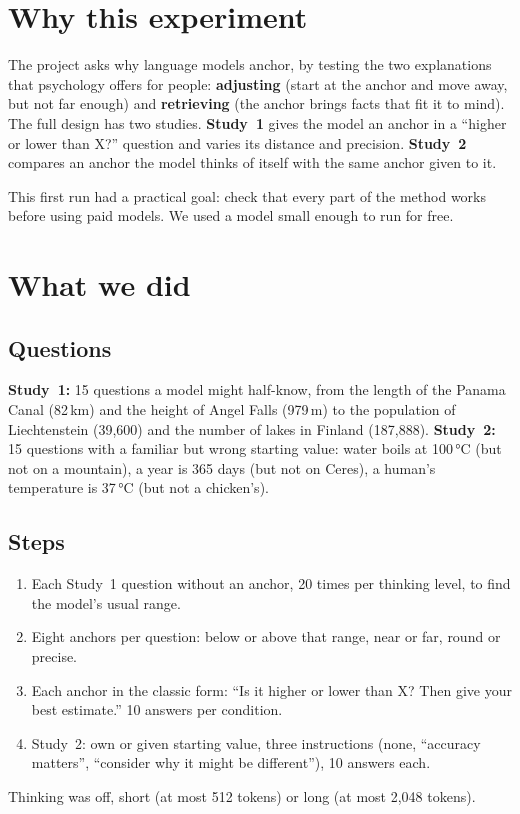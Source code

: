 \documentclass[11pt,a4paper]{article}
\begin{document}
\section{Why this experiment}

The project asks why language models anchor, by testing the two explanations that psychology offers for people: \textbf{adjusting} (start at the anchor and move away, but not far enough) and \textbf{retrieving} (the anchor brings facts that fit it to mind). The full design has two studies. \textbf{Study~1} gives the model an anchor in a \enquote{higher or lower than X?} question and varies its distance and precision. \textbf{Study~2} compares an anchor the model thinks of itself with the same anchor given to it.

This first run had a practical goal: check that every part of the method works before using paid models. We used a model small enough to run for free.

\section{What we did}

\subsection{Questions}
\textbf{Study~1:} 15 questions a model might half-know, from the length of the Panama Canal (82\,km) and the height of Angel Falls (979\,m) to the population of Liechtenstein (39,600) and the number of lakes in Finland (187,888). \textbf{Study~2:} 15 questions with a familiar but wrong starting value: water boils at 100\,°C (but not on a mountain), a year is 365 days (but not on Ceres), a human's temperature is 37\,°C (but not a chicken's).

\subsection{Steps}
\begin{enumerate}[leftmargin=*]
  \item Each Study~1 question without an anchor, 20 times per thinking level, to find the model's usual range.
  \item Eight anchors per question: below or above that range, near or far, round or precise.
  \item Each anchor in the classic form: \enquote{Is it higher or lower than X? Then give your best estimate.} 10 answers per condition.
  \item Study~2: own or given starting value, three instructions (none, \enquote{accuracy matters}, \enquote{consider why it might be different}), 10 answers each.
\end{enumerate}
Thinking was off, short (at most 512 tokens) or long (at most 2,048 tokens).
\end{document}
